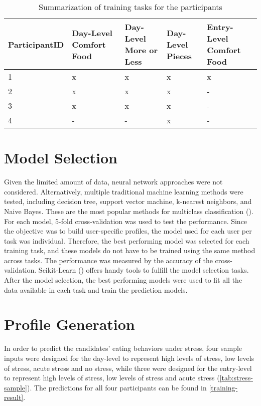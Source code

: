 \begin{table}[htpb]
  \caption[Models Trained]{Summarization of training tasks for the participants}\label{tab:models}
  \centering
  \tiny
  \begin{tabular}{l l l l l}
    \toprule
      ParticipantID & Day-Level Comfort Food & Day-Level More or Less & Day-Level Pieces & Entry-Level Comfort Food \\
    \midrule
      1 & x & x & x & x \\
      2 & x & x & x & - \\
      3 & x & x & x & - \\
      4 & - & - & x & - \\
    \bottomrule
  \end{tabular}
\end{table}

\bigskip
\section{Model Selection}
Given the limited amount of data, neural network approaches were not considered. Alternatively, multiple traditional machine learning methods were tested, including decision tree, support vector machine, k-nearest neighbors, and Naive Bayes. These are the most popular methods for multiclass classification (\cite{43_multiclass_classification}). For each model, 5-fold cross-validation was used to test the performance. Since the objective was to build user-specific profiles, the model used for each user per task was individual. Therefore, the best performing model was selected for each training task, and these models do not have to be trained using the same method across tasks. The performance was measured by the accuracy of the cross-validation. Scikit-Learn (\cite{44_sklearn}) offers handy tools to fulfill the model selection tasks. After the model selection, the best performing models were used to fit all the data available in each task and train the prediction models.

\section{Profile Generation}
In order to predict the candidates' eating behaviors under stress, four sample inputs were designed for the day-level to represent high levels of stress, low levels of stress, acute stress and no stress, while three were designed for the entry-level to represent high levels of stress, low levels of stress and acute stress (\autoref{tab:stress-sample}). The predictions for all four participants can be found in \autoref{training-result}.


